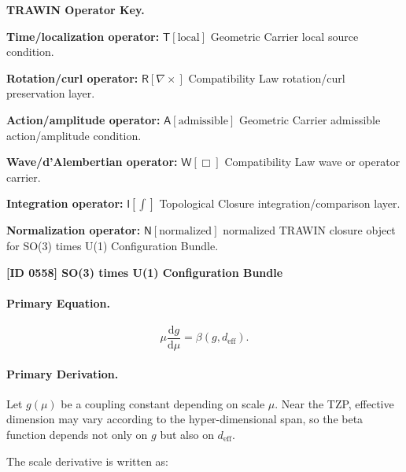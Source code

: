 \par\vspace{0.45\baselineskip}
\noindent\begin{minipage}[t]{\linewidth}
\begingroup
\small
\raggedright
\textbf{TRAWIN Operator Key.}\par
\noindent\textbf{Time/localization operator:} $\mathsf{T}\!\left[\mathrm{local}\right]$ Geometric Carrier local source condition.\par
\noindent\textbf{Rotation/curl operator:} $\mathsf{R}\!\left[\nabla\times\right]$ Compatibility Law rotation/curl preservation layer.\par
\noindent\textbf{Action/amplitude operator:} $\mathsf{A}\!\left[\mathrm{admissible}\right]$ Geometric Carrier admissible action/amplitude condition.\par
\noindent\textbf{Wave/d'Alembertian operator:} $\mathsf{W}\!\left[\Box\right]$ Compatibility Law wave or operator carrier.\par
\noindent\textbf{Integration operator:} $\mathsf{I}\!\left[\int\right]$ Topological Closure integration/comparison layer.\par
\noindent\textbf{Normalization operator:} $\mathsf{N}\!\left[\mathrm{normalized}\right]$ normalized TRAWIN closure object for SO(3) times U(1) Configuration Bundle.\par
\endgroup
\end{minipage}

\clearpage
\noindent\textbf{[ID 0558] SO(3) times U(1) Configuration Bundle}\par
\vspace{0.35em}
\paragraph{Primary Equation.}
\begin{equation}
\mu\frac{\mathrm{d}g}{\mathrm{d}\mu}
=
\beta(g,d_{\mathrm{eff}}).
\end{equation}

\paragraph{Primary Derivation.}
Let $g(\mu)$ be a coupling constant depending on scale $\mu$.  
Near the TZP, effective dimension may vary according to the hyper-dimensional span, so the beta function depends not only on $g$ but also on $d_{\mathrm{eff}}$.

The scale derivative is written as:

